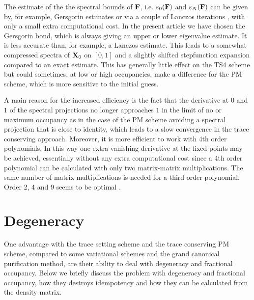 \commentoutA{\documentclass[prb,aps,twocolumn,twocolumngrid,secnumarabic,superbib,hyperref]{revtex4}}
\begin{document}
The estimate of the the spectral bounds of $\bf F$, i.e. 
$\varepsilon_0({\bf F})$ and $\varepsilon_N({\bf F})$ can be given
by, for example, Gersgorin estimates \cite{Palser98}
or via a couple of Lanczos iterations \cite{Daniels99},
with only a small extra computational cost. In the present
article we have chosen the Gersgorin bond, which is
always giving an upper or lower eigenvalue estimate.
It is less accurate than, for example, a Lanczos
estimate. This leads to a somewhat compressed
spectra of ${\bf X}_0$ on $[0,1]$ and a slightly shifted
stepfunction expansion compared to an exact estimate.
This has generally little effect on the TS4 scheme but
could sometimes, at low or high occupancies, make a difference
for the PM scheme, which is more sensitive to the initial
guess.

A main reason for the increased efficiency is the fact that
the derivative at $0$ and $1$ of the spectral projections 
no longer approaches $1$ in the limit of no or maximum
occupancy as in the case of the PM scheme avoiding a spectral
projection that is close to identity, which leads to a slow
convergence in the trace conserving approach. Moreover, it is more efficient to 
work with 4th order polynomials. In this way one extra vanishing
derivative at the fixed points may be achieved, essentially without any
extra computational cost since a 4th order polynomial can be
calculated with only two matrix-matrix multiplications. The
same number of matrix multiplications is needed for a third
order polynomial. Order 2, 4 and 9 seems to be optimal \cite{Niklasson02}.


\section{Degeneracy}\label{Degen}

One advantage with the trace setting scheme and the trace
conserving PM scheme, compared to some variational schemes \cite{Li93}
and the grand canonical purification method,
are their ability to deal with degeneracy and fractional occupancy.
Below we briefly discuss the problem with degeneracy and fractional
occupancy, how they destroys idempotency and how they can be calculated
from the density matrix.
\end{document}

